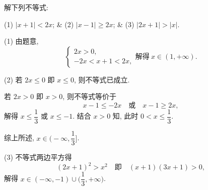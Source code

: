 \begin{example}
  解下列不等式:
  \begin{threecolpro}
    (1) $|x+1|<2x$; & (2) $|x-1|\geqslant 2x$; 
    & (3) $|2x+1|> |x|$.
  \end{threecolpro}
\end{example}
\begin{solution}
  (1) 由题意,
  \[\left\{\!\!\begin{array}{l}
    2x>0,\\
    -2x<x+1<2x,
  \end{array}\right.\text{解得}\ x\in(1,+\infty).\]
  
  (2) 若 $2x\leqslant 0$ 即 $x\leqslant 0$, 则不等式已成立. 
  
  若 $2x> 0$ 即 $x> 0$, 则不等式等价于 
  \[x-1\leqslant -2x\quad \text{或}\quad x-1\geqslant 2x,\]
  解得 $x\leqslant \dfrac13$ 或 $x\leqslant -1$. 结合 $x>0$ 知, 此时 $0<x\leqslant \dfrac13$. 
  
  综上所述, $x\in\biggl(-\infty,\dfrac13\biggr]$.
  
  (3) 不等式两边平方得 
  \[(2x+1)^2>x^2\quad \text{即}\quad (x+1)(3x+1)>0,\]
  解得 $x\in(-\infty,-1)\cup \biggl(\dfrac13,+\infty\biggr)$.
\end{solution}
